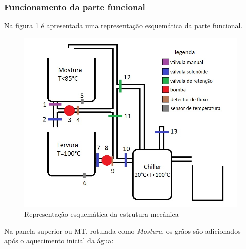 \subsubsection{Funcionamento da parte funcional}

Na figura \ref{esboco} é apresentada uma representação esquemática da parte funcional.

\begin{figure}[H]
	\centering
	\includegraphics[scale=0.55]{./Resources/esb_mec.jpg}
	\captionsetup{justification=centering}
	\caption[Representação esquemática da estrutura mecânica]{Representação esquemática da estrutura mecânica}
	\label{esboco}
\end{figure}

Na panela superior ou MT, rotulada como \textit{Mostura}, os grãos são adicionados após o aquecimento inicial da água:

